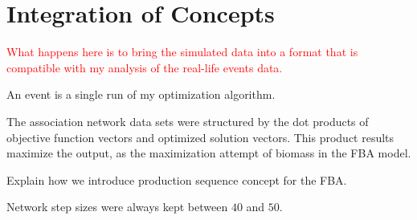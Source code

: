 \section{Integration of Concepts}
\textcolor{red}{What happens here is to bring the simulated data into a format that is compatible with my analysis of the real-life events data.}


{\color{red} 
	An event is a single run of my optimization algorithm.
	
	The association network data sets were structured by the dot products of objective function vectors and optimized solution vectors. This product results maximize the output, as the maximization attempt of biomass in the FBA model.
	
	Explain how we introduce production sequence concept for the FBA.
	
	Network step sizes were always kept between $40$ and $50$.
}
